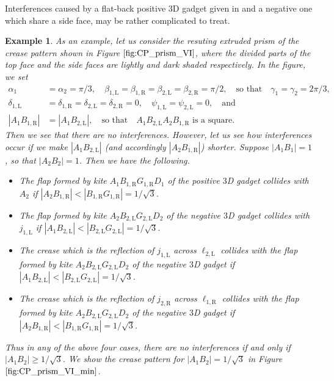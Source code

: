 \documentclass[11pt]{amsart}
\newtheorem{example}[theorem]{Example}
\numberwithin{equation}{section}
\numberwithin{theorem}{section}
\newcommand{\Lt}{\ensuremath{\mathrm{L}}}
\newcommand{\Rt}{\ensuremath{\mathrm{R}}}
\newcommand{\norm}[1]{\ensuremath{\left| #1 \right|}}
\begin{document}
Interferences caused by a flat-back positive $3$D gadget given in \cite{Doi20} and a negative one which share a side face, may be rather complicated to treat.
\begin{example}\label{ex:prism_VI}\rm
As an example, let us consider the resuting extruded prism of the crease pattern shown in Figure $\ref{fig:CP_prism_VI}$,
where the divided parts of the top face and the side faces are lightly and dark shaded respectively.
In the figure, we set
\begin{align*}
\alpha_1&=\alpha_2=\pi /3,\quad\beta_{1,\Lt}=\beta_{1,\Rt}=\beta_{2,\Lt}=\beta_{2,\Rt}=\pi /2,\quad\text{so that}\quad\gamma_1=\gamma_2=2\pi /3,\\
\delta_{1,\Lt}&=\delta_{1,\Rt}=\delta_{2,\Lt}=\delta_{2,\Rt}=0,\quad\psi_{1,\Lt}=\psi_{2,\Lt}=0,\quad\text{and}\\
\norm{A_1 B_{1,\Rt}}&=\norm{A_1 B_{2,\Lt}},\quad\text{so that}\quad A_1 B_{2,\Lt}A_2 B_{1,\Rt}\text{ is a square}.
\end{align*}
Then we see that there are no interferences.
However, let us see how interferences occur if we make $\norm{A_1 B_{2,\Lt}}$ (and accordingly $\norm{A_2 B_{1,\Rt}}$) shorter.
Suppose $\norm{A_1 B_1}=1$, so that $\norm{A_2 B_2}=1$.
Then we have the following.
\begin{itemize}
\item The flap formed by kite $A_1 B_{1,\Rt}G_{1,\Rt}D_1$ of the positive $3$D gadget collides with $A_2$
if $\norm{A_2 B_{1,\Rt}}<\norm{B_{1,\Rt}G_{1,\Rt}}=1/\sqrt{3}$.
\item The flap formed by kite $A_2 B_{2,\Lt}G_{2,\Lt}D_2$ of the negative $3$D gadget collides with $j_{1,\Lt}$
if $\norm{A_1 B_{2,\Lt}}<\norm{B_{2,\Lt}G_{2,\Lt}}=1/\sqrt{3}$.
\item The crease which is the reflection of $j_{1,\Lt}$ across $\ell_{2,\Lt}$
collides with the flap formed by kite $A_2 B_{2,\Lt}G_{2,\Lt}D_2$ of the negative $3$D gadget
if $\norm{A_1 B_{2,\Lt}}<\norm{B_{2,\Lt}G_{2,\Lt}}=1/\sqrt{3}$.
\item The crease which is the reflection of $j_{2,\Rt}$ across $\ell_{1,\Rt}$
collides with the flap formed by kite $A_2 B_{2,\Lt}G_{2,\Lt}D_2$ of the negative $3$D gadget
if $\norm{A_2 B_{1,\Rt}}<\norm{B_{1,\Rt}G_{1,\Rt}}=1/\sqrt{3}$.
\end{itemize}
Thus in any of the above four cases, there are no interferences if and only if $\norm{A_1 B_2}\geqslant 1/\sqrt{3}$.
We show the crease pattern for $\norm{A_1 B_2}=1/\sqrt{3}$ in Figure $\ref{fig:CP_prism_VI_min}$.
\end{example}
\end{document}
